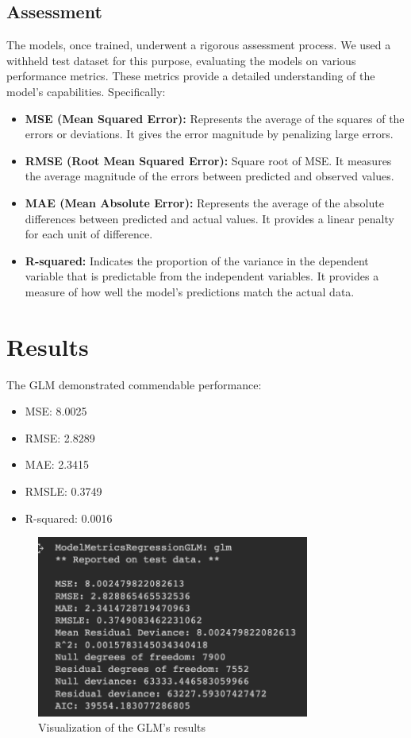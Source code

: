 \documentclass[12pt]{article}
\begin{document}
\subsection{Assessment}
The models, once trained, underwent a rigorous assessment process. We used a withheld test dataset for this purpose, evaluating the models on various performance metrics. These metrics provide a detailed understanding of the model's capabilities. Specifically:
\begin{itemize}
    \item \textbf{MSE (Mean Squared Error):} Represents the average of the squares of the errors or deviations. It gives the error magnitude by penalizing large errors.
    \item \textbf{RMSE (Root Mean Squared Error):} Square root of MSE. It measures the average magnitude of the errors between predicted and observed values.
    \item \textbf{MAE (Mean Absolute Error):} Represents the average of the absolute differences between predicted and actual values. It provides a linear penalty for each unit of difference.
    \item \textbf{R-squared:} Indicates the proportion of the variance in the dependent variable that is predictable from the independent variables. It provides a measure of how well the model's predictions match the actual data.
\end{itemize}

\section{Results}
The GLM demonstrated commendable performance:
\begin{itemize}
    \item MSE: 8.0025
    \item RMSE: 2.8289
    \item MAE: 2.3415
    \item RMSLE: 0.3749
    \item R-squared: 0.0016
\end{itemize}

\begin{figure}[h]
\centering
\includegraphics[width=0.8\textwidth]{path_to_result_visualization.png}
\caption{Visualization of the GLM's results}
\end{figure}
\end{document}
